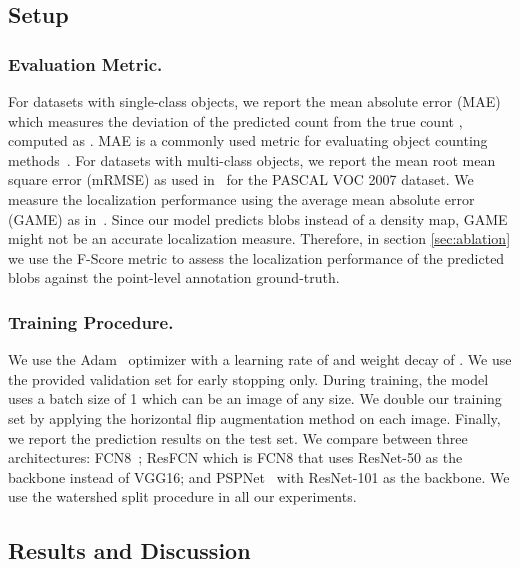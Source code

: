 \documentclass[runningheads]{llncs}
\begin{document}
\subsection{Setup}
\subsubsection{Evaluation Metric.}
For datasets with single-class objects, we report the mean absolute error (MAE) which measures the deviation of the predicted count  from the true count , computed as . MAE is a commonly used metric for evaluating object counting methods~\cite{charles2015nonnegative,sindagi2017survey}. For datasets with multi-class objects, we report the mean root mean square error (mRMSE) as used in~\cite{chattopadhyay2016counting}
for the PASCAL VOC 2007 dataset. We measure the localization performance using the average mean absolute error (GAME) as in~\cite{TRANCOSdataset_IbPRIA2015}. Since our model predicts blobs instead of a density map, GAME might not be an accurate localization measure. Therefore, in section \ref{sec:ablation} we use the F-Score metric to assess the localization performance of the predicted blobs against the point-level annotation ground-truth.


\subsubsection{Training Procedure.}
We use the Adam~\cite{kingma2014adam} optimizer with a learning rate of  and weight decay of . We use the provided validation set for early stopping only. During training, the model uses a batch size of 1 which can be an image of any size. We double our training set by applying the horizontal flip augmentation method on each image. Finally, we report the prediction results on the test set. We compare between three architectures: FCN8~\cite{long2015fully}; ResFCN which is FCN8 that uses ResNet-50 as the backbone instead of VGG16; and PSPNet~\cite{zhao2017pyramid} with ResNet-101 as the backbone. We use the watershed split procedure in all our experiments.


\subsection{Results and Discussion}\label{sec:results}
\end{document}
